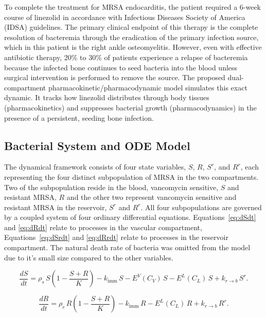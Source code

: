 \documentclass[12pt, draftcls, onecolumn]{IEEEtran}
\begin{document}
To complete the treatment for MRSA endocarditis, the patient required a 6-week course of linezolid in accordance with Infectious Diseases Society of America (IDSA) guidelines. The primary clinical endpoint of this therapy is the complete resolution of bacteremia through the eradication of the primary infection source, which in this patient is the right ankle osteomyelitis. However, even with effective antibiotic therapy, 20\% to 30\% of patients experience a relapse of bacteremia because the infected bone continues to seed bacteria into the blood unless surgical intervention is performed to remove the source. The proposed dual-compartment pharmacokinetic/pharmacodynamic model simulates this exact dynamic.  It tracks how linezolid distributes through body tissues (pharmacokinetics) and suppresses bacterial growth (pharmacodynamics) in the presence of a persistent, seeding bone infection.

\subsection{Bacterial System and ODE Model}
The dynamical framework consists of four state variables, $S$, $R$, $S^r$, and $R^r$, each representing the four distinct
subpopulation of MRSA in the two compartments.  Two of the subpopulation reside in the blood, vancomycin sensitive, $S$ and
resistant MRSA, $R$ and the other two represent vancomycin sensitive and resistant
MRSA in the reservoir, $S^r$ and $R^r$.  All four subpopulations are governed by a coupled system of four ordinary differential equations.
Equations~\eqref{eq:dSdt} and \eqref{eq:dRdt} relate to processes in the vascular compartment, Equations~\eqref{eq:dSrdt} and \eqref{eq:dRrdt} 
relate to processes in the reservoir compartment.  The natural death rate of bacteria was omitted from the model due to it's small size
compared to the other variables.


\begin{equation}
\label{eq:dSdt}
\frac{dS}{dt}
= \rho_{s}\, S \left( 1 - \frac{S + R}{K} \right)
- k_{\text{imm}}\, S
- E^{V}(C_V)\, S
- E^{L}(C_L)\, S
+ k_{r\to b}\, S^r .
\end{equation}


\begin{equation}
\frac{dR}{dt}
= \rho_{r}\,R \left( 1 - \frac{S + R}{K} \right)
- k_{\text{imm}}\, R
- E^{L}(C_L)\, R
+ k_{r\to b}\, R^r .
\label{eq:dRdt}
\end{equation}
\end{document}
